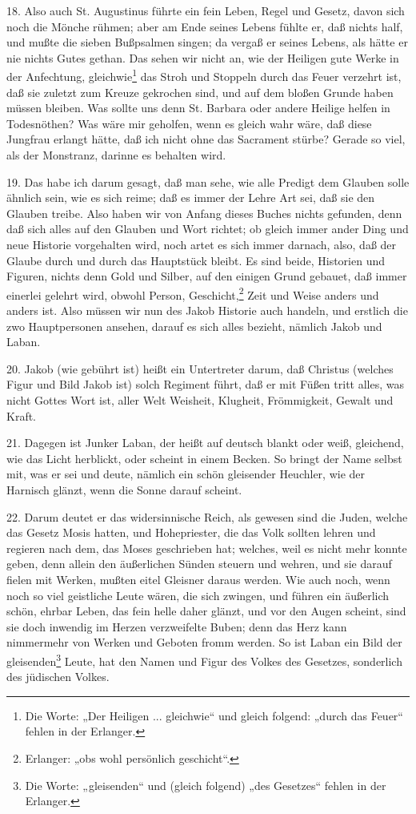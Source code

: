 18. Also auch St. Augustinus führte ein fein Leben, Regel und Gesetz, davon sich noch die Mönche rühmen; aber am Ende seines Lebens fühlte er, daß nichts half, und mußte die sieben Bußpsalmen singen; da vergaß er seines Lebens, als hätte er nie nichts Gutes gethan. Das sehen wir nicht an, wie der Heiligen gute Werke in der Anfechtung, gleichwie\footnote{Die Worte: „Der Heiligen ... gleichwie“ und gleich folgend: „durch das Feuer“ fehlen in der Erlanger.} das Stroh und Stoppeln durch das Feuer verzehrt ist, daß sie zuletzt zum Kreuze gekrochen sind, und auf dem bloßen Grunde haben müssen bleiben. Was sollte uns denn St. Barbara oder andere Heilige helfen in Todesnöthen? Was wäre mir geholfen, wenn es gleich wahr wäre, daß diese Jungfrau erlangt hätte, daß ich nicht ohne das Sacrament stürbe? Gerade so viel, als der Monstranz, darinne es behalten wird.

19. Das habe ich darum gesagt, daß man sehe, wie alle Predigt dem Glauben solle ähnlich sein, wie es sich reime; daß es immer der Lehre Art sei, daß sie den Glauben treibe. Also haben wir von Anfang dieses Buches nichts gefunden, denn daß sich alles auf den Glauben und Wort richtet; ob gleich immer ander Ding und neue Historie vorgehalten wird, noch artet es sich immer darnach, also, daß der Glaube durch und durch das Hauptstück bleibt. Es sind beide, Historien und Figuren, nichts denn Gold und Silber, auf den einigen Grund gebauet, daß immer einerlei gelehrt wird, obwohl Person, Geschicht,\footnote{Erlanger: „obs wohl persönlich geschicht“.} Zeit und Weise anders und anders ist. Also müssen wir nun des Jakob Historie auch handeln, und erstlich die zwo Hauptpersonen ansehen, darauf es sich alles bezieht, nämlich Jakob und Laban.

20. Jakob (wie gebührt ist) heißt ein Untertreter darum, daß Christus (welches Figur und Bild Jakob ist) solch Regiment führt, daß er mit Füßen tritt alles, was nicht Gottes Wort ist, aller Welt Weisheit, Klugheit, Frömmigkeit, Gewalt und Kraft.

21. Dagegen ist Junker Laban, der heißt auf deutsch blankt oder weiß, gleichend, wie das Licht herblickt, oder scheint in einem Becken. So bringt der Name selbst mit, was er sei und deute, nämlich ein schön gleisender Heuchler, wie der Harnisch glänzt, wenn die Sonne darauf scheint.

22. Darum deutet er das widersinnische Reich, als gewesen sind die Juden, welche das Gesetz Mosis hatten, und Hohepriester, die das Volk sollten lehren und regieren nach dem, das Moses geschrieben hat; welches, weil es nicht mehr konnte geben, denn allein den äußerlichen Sünden steuern und wehren, und sie darauf fielen mit Werken, mußten eitel Gleisner daraus werden. Wie auch noch, wenn noch so viel geistliche Leute wären, die sich zwingen, und führen ein äußerlich schön, ehrbar Leben, das fein helle daher glänzt, und vor den Augen scheint, sind sie doch inwendig im Herzen verzweifelte Buben; denn das Herz kann nimmermehr von Werken und Geboten fromm werden. So ist Laban ein Bild der gleisenden\footnote{Die Worte: „gleisenden“ und (gleich folgend) „des Gesetzes“ fehlen in der Erlanger.} Leute, hat den Namen und Figur des Volkes des Gesetzes, sonderlich des jüdischen Volkes.

